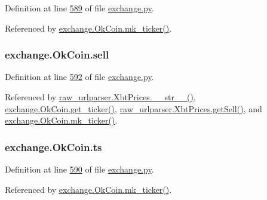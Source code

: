 Definition at line \hyperlink{exchange_8py_source_l00589}{589} of file \hyperlink{exchange_8py_source}{exchange.\+py}.



Referenced by \hyperlink{exchange_8py_source_l00614}{exchange.\+Ok\+Coin.\+mk\+\_\+ticker()}.

\subsubsection[{\texorpdfstring{sell}{sell}}]{\setlength{\rightskip}{0pt plus 5cm}exchange.\+Ok\+Coin.\+sell}\hypertarget{classexchange_1_1_ok_coin_aadb487d2e2f277374a747e1bcb0bd40b}{}\label{classexchange_1_1_ok_coin_aadb487d2e2f277374a747e1bcb0bd40b}


Definition at line \hyperlink{exchange_8py_source_l00592}{592} of file \hyperlink{exchange_8py_source}{exchange.\+py}.



Referenced by \hyperlink{raw__urlparser_8py_source_l00074}{raw\+\_\+urlparser.\+Xbt\+Prices.\+\_\+\+\_\+str\+\_\+\+\_\+()}, \hyperlink{exchange_8py_source_l00600}{exchange.\+Ok\+Coin.\+get\+\_\+ticker()}, \hyperlink{raw__urlparser_8py_source_l00065}{raw\+\_\+urlparser.\+Xbt\+Prices.\+get\+Sell()}, and \hyperlink{exchange_8py_source_l00614}{exchange.\+Ok\+Coin.\+mk\+\_\+ticker()}.

\subsubsection[{\texorpdfstring{ts}{ts}}]{\setlength{\rightskip}{0pt plus 5cm}exchange.\+Ok\+Coin.\+ts}\hypertarget{classexchange_1_1_ok_coin_a0fe6263a7f58a6fa8a688929976b7e4a}{}\label{classexchange_1_1_ok_coin_a0fe6263a7f58a6fa8a688929976b7e4a}


Definition at line \hyperlink{exchange_8py_source_l00590}{590} of file \hyperlink{exchange_8py_source}{exchange.\+py}.



Referenced by \hyperlink{exchange_8py_source_l00614}{exchange.\+Ok\+Coin.\+mk\+\_\+ticker()}.

